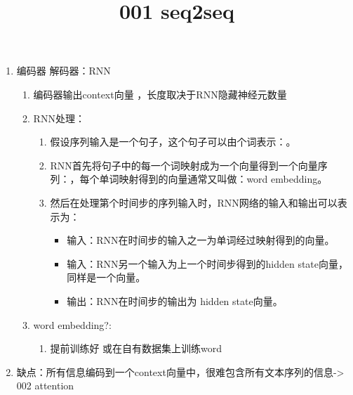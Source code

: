 \documentclass[
]{article}
\title{001 seq2seq}
\author{}
\date{}
\providecommand{\tightlist}{%
  \setlength{\itemsep}{0pt}\setlength{\parskip}{0pt}}
\begin{document}
\maketitle

\begin{enumerate}
\item
  编码器 解码器：RNN

  \begin{enumerate}
  \item
    编码器输出context向量 ，长度取决于RNN隐藏神经元数量
  \item
    RNN处理：

    \begin{enumerate}
    \item
      假设序列输入是一个句子，这个句子可以由{}个词表示：{}。
    \item
      RNN首先将句子中的每一个词映射成为一个向量得到一个向量序列：{}，每个单词映射得到的向量通常又叫做：word
      embedding。
    \item
      然后在处理第{}个时间步的序列输入{}时，RNN网络的输入和输出可以表示为：{}

      \begin{itemize}
      \tightlist
      \item
        输入：RNN在时间步{}的输入之一为单词{}经过映射得到的向量{}。
      \item
        输入：RNN另一个输入为上一个时间步{}得到的hidden
        state向量{}，同样是一个向量。
      \item
        输出：RNN在时间步{}的输出为{} hidden state向量。
      \end{itemize}
    \end{enumerate}
  \item
    word embedding?:

    \begin{enumerate}
    \tightlist
    \item
      提前训练好 或在自有数据集上训练word
    \end{enumerate}
  \end{enumerate}
\item
  缺点：所有信息编码到一个context向量中，很难包含所有文本序列的信息-\textgreater{}
  002 attention
\end{enumerate}
\end{document}
